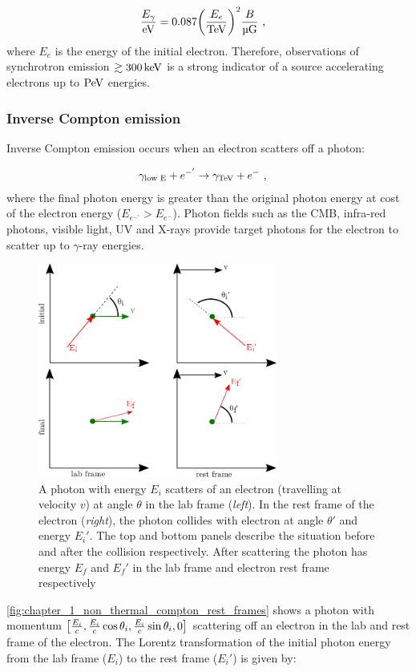 \begin{equation}
    \begin{aligned}
    \frac{E_\gamma}{\eV}&=0.087 \qty(\frac{E_e}{\TeV})^2 \frac{B}{\si{\micro G}}\text{ ,}
    \end{aligned}
\end{equation}
\noindent where $E_e$ is the energy of the initial electron. Therefore, observations of synchrotron emission $\gtrsim 300\,\si{\kilo\electronvolt}$ is a strong indicator of a source accelerating electrons up to $\PeV$ energies.

\subsubsection{Inverse Compton emission}

Inverse Compton emission occurs when an electron scatters off a photon:

\begin{align}
	\gamma_\text{low E} + e^{-'}&\rightarrow \gamma_{\TeV}+e^{-}\text{ ,}
\end{align}
where the final photon energy is greater than the original photon energy at cost of the electron energy ($E_{e^{-'}}>E_{e^-}$). Photon fields such as the CMB, infra-red photons, visible light, UV and X-rays provide target photons for the electron to scatter up to $\gamma$-ray energies. 
\newpar
\begin{figure}[h!]
	\centering
	\includegraphics[width=0.7\textwidth]{04_Introduction/Images/non_thermal_emission/inverse_compton.pdf}
	\caption{A photon with energy $E_i$ scatters of an electron (travelling at velocity $v$) at angle $\theta$ in the lab frame (\textit{left}). In the rest frame of the electron (\textit{right}), the photon collides with electron at angle $\theta'$ and energy $E_i'$. The top and bottom panels describe the situation before and after the collision respectively. After scattering the photon has energy $E_f$ and $E_f'$ in the lab frame and electron rest frame respectively}
	\label{fig:chapter_1_non_thermal_compton_rest_frames}
\end{figure}
\autoref{fig:chapter_1_non_thermal_compton_rest_frames} shows a photon with momentum $\qty[\frac{E_i}{c},\frac{E_i}{c}\cos\theta_i,\frac{E_i}{c}\sin\theta_i,0]$ scattering off an electron in the lab and rest frame of the electron. The Lorentz transformation of the initial photon energy from the lab frame ($E_i$) to the rest frame ($E_i'$) is given by:

